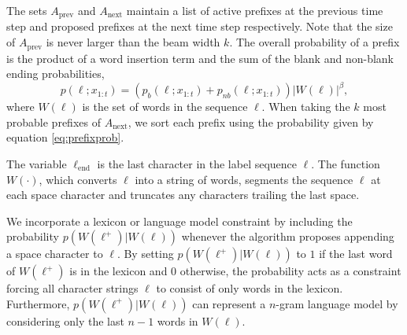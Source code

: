 The sets $A_{\text{prev}}$ and $A_{\text{next}}$ maintain a list of active
prefixes at the previous time step and proposed prefixes at the next time step
respectively. Note that the size of $A_{\text{prev}}$ is never larger than the
beam width $k$. The overall probability of a prefix is the product of a word
insertion term and the sum of the blank and non-blank ending probabilities,
\begin{equation}\label{eq:prefixprob}
  p(\ell; x_{1:t}) = (p_b(\ell; x_{1:t}) + p_{nb}(\ell; x_{1:t})) |W(\ell)|^\beta,
\end{equation}
where $W(\ell)$ is the set of words in the sequence $\ell$. When taking the $k$
most probable prefixes of $A_{\text{next}}$, we sort each prefix using the
probability given by equation \ref{eq:prefixprob}.

The variable $\ell_{\text{end}}$ is the last character in the label sequence
$\ell$. The function $W(\cdot)$, which converts $\ell$ into a string of words,
segments the sequence $\ell$ at each space character and truncates any
characters trailing the last space. 

We incorporate a lexicon or language model constraint by including the
probability $p(W(\ell^+) | W(\ell))$ whenever the algorithm proposes appending
a space character to $\ell$. By setting $p(W(\ell^+) | W(\ell))$ to $1$ if the
last word of $W(\ell^+)$ is in the lexicon and $0$ otherwise, the probability
acts as a constraint forcing all character strings $\ell$ to consist of only
words in the lexicon.  Furthermore, $p(W(\ell^+) | W(\ell))$ can represent a
$n$-gram language model by considering only the last $n-1$ words in $W(\ell)$.  

